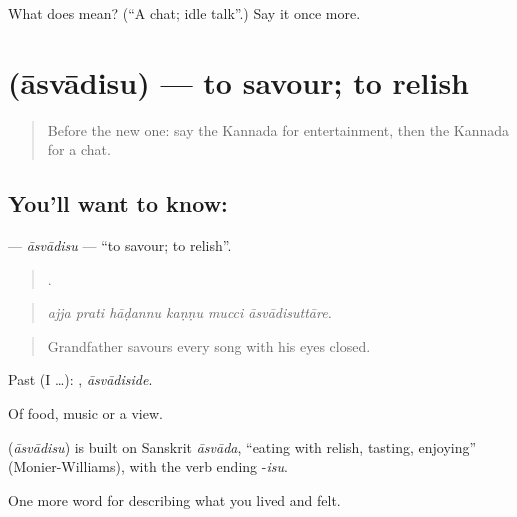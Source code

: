 \begin{tcolorbox}[breakable,colback=teal!4,colframe=teal!35!black,title={Before you move on}]
What does  mean? (\textquotedblleft{}A chat; idle talk\textquotedblright{}.) Say it once more.
\end{tcolorbox}
\section[\texorpdfstring{\kn{ಆಸ್ವಾದಿಸು} (āsvādisu)}{ಆಸ್ವಾದಿಸು (āsvādisu)}]{ (āsvādisu) — to savour; to relish}

\label{lesson:KA-C530-asvadisu}



\begin{quote}
Before the new one: say the Kannada for entertainment, then the Kannada for a chat.
\end{quote}

\subsection*{You'll want to know: }
\textbf{} — \emph{āsvādisu} — \textquotedblleft{}to savour; to relish\textquotedblright{}.

\begin{quote}
     .
\end{quote}

\begin{quote}
\emph{ajja prati hāḍannu kaṇṇu mucci āsvādisuttāre.}
\end{quote}

\begin{quote}
Grandfather savours every song with his eyes closed.
\end{quote}

Past (I …): , \emph{āsvādiside}.

Of food, music or a view.

\begin{cousinweb}
\textbf{} (\emph{āsvādisu}) is built on Sanskrit \emph{āsvāda}, \textquotedblleft{}eating with relish, tasting, enjoying\textquotedblright{} (Monier-Williams), with the verb ending -\emph{isu}.
\end{cousinweb}

\begin{grammarlens}[title={What you've built}]
One more word for describing what you lived and felt.
\end{grammarlens}

